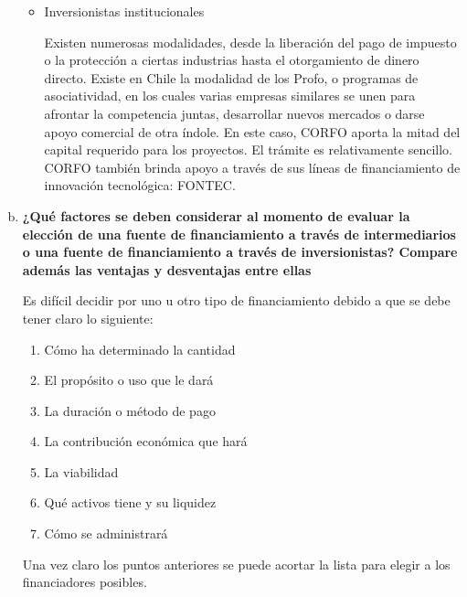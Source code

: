 \begin{enumerate}[(a)]
\begin{itemize}
                \item  Inversionistas institucionales
            
                    Existen numerosas modalidades, desde la liberación del pago de impuesto o la protección a ciertas industrias hasta el otorgamiento 
                    de dinero directo. Existe en Chile la modalidad de los Profo, o programas de asociatividad, en los cuales varias empresas similares 
                    se unen para afrontar la competencia juntas, desarrollar nuevos mercados o darse apoyo comercial de otra índole. En este caso, 
                    CORFO aporta la mitad del capital requerido para los proyectos. El trámite es relativamente sencillo. CORFO también brinda apoyo a través 
                    de sus líneas de financiamiento de innovación tecnológica: FONTEC.
            \end{itemize}



    \item {\bf ¿Qué factores se deben considerar al momento de evaluar la elección de una
          fuente de financiamiento a través de intermediarios o una fuente de financiamiento
          a través de inversionistas? Compare además las ventajas y desventajas entre ellas}\\


            Es difícil decidir por uno u otro tipo de financiamiento debido a que se debe tener claro lo siguiente:
           
            \begin{enumerate} 
                \item Cómo ha determinado la cantidad
                \item El propósito o uso que le dará
                \item La duración o método de pago
                \item La contribución económica que hará
                \item La viabilidad
                \item Qué activos tiene y su liquidez
                \item Cómo se administrará
            \end{enumerate}
            
            Una vez claro los puntos anteriores se puede acortar la lista para elegir a los financiadores posibles. 


\end{enumerate}
